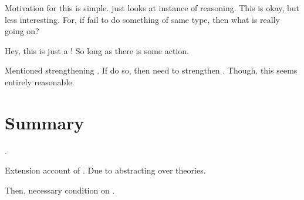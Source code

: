 \begin{note}
  Motivation for this is simple.
  \tR{} just looks at instance of reasoning.
  This is okay, but less interesting.
  For, if fail to do something of same type, then what is really going on?
\end{note}

\begin{note}
  \color{red}
  \begin{proposition}[\tC{2} and \fc{1}]
    Hey, this is just a \fc{}!
    So long as there is some action.
  \end{proposition}

  Mentioned strengthening .
  If do so, then need to strengthen \tC{}.
  Though, this seems entirely reasonable.
\end{note}


\section*{Summary}

\begin{note}
  .

  Extension account of \tor{}.
  Due to abstracting over theories.

  Then, necessary condition on \tR{}.
\end{note}





